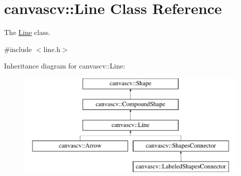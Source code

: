 \hypertarget{classcanvascv_1_1Line}{}\section{canvascv\+:\+:Line Class Reference}
\label{classcanvascv_1_1Line}


The \hyperlink{classcanvascv_1_1Line}{Line} class.  




{\ttfamily \#include $<$line.\+h$>$}

Inheritance diagram for canvascv\+:\+:Line\+:\begin{figure}[H]
\begin{center}
\leavevmode
\includegraphics[height=5.000000cm]{classcanvascv_1_1Line}
\end{center}
\end{figure}

